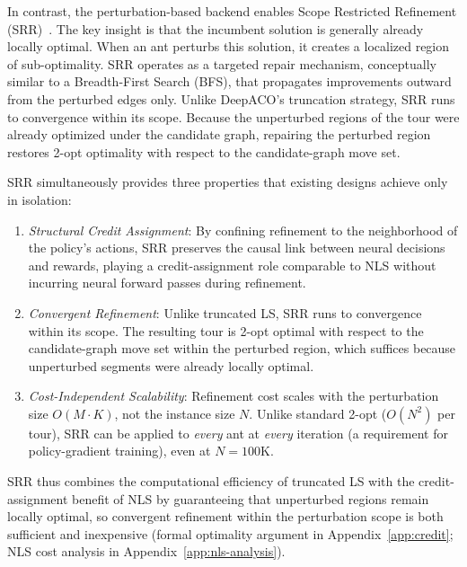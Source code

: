 \documentclass[sigconf]{acmart}
\begin{document}
In contrast, the perturbation-based backend enables Scope Restricted Refinement (SRR)~\cite{faco}.
The key insight is that the incumbent solution is generally already locally optimal.
When an ant perturbs this solution, it creates a localized region of sub-optimality.
SRR operates as a targeted repair mechanism, conceptually similar to a Breadth-First Search (BFS), that propagates improvements outward from the perturbed edges only.
Unlike DeepACO's truncation strategy, SRR runs to convergence within its scope.
Because the unperturbed regions of the tour were already optimized under the candidate graph, repairing the perturbed region restores 2-opt optimality with respect to the candidate-graph move set.

SRR simultaneously provides three properties that existing designs achieve only in isolation:
\begin{enumerate}
    \item \emph{Structural Credit Assignment}: By confining refinement to the neighborhood of the policy's actions, SRR preserves the causal link between neural decisions and rewards, playing a credit-assignment role comparable to NLS without incurring neural forward passes during refinement.
    \item \emph{Convergent Refinement}: Unlike truncated LS, SRR runs to convergence within its scope.  The resulting tour is 2-opt optimal with respect to the candidate-graph move set within the perturbed region, which suffices because unperturbed segments were already locally optimal.
    \item \emph{Cost-Independent Scalability}: Refinement cost scales with the perturbation size $O(M{\cdot}K)$, not the instance size $N$.  Unlike standard 2-opt ($O(N^2)$ per tour), SRR can be applied to \emph{every} ant at \emph{every} iteration (a requirement for policy-gradient training), even at $N{=}100$K.
\end{enumerate}
\noindent SRR thus combines the computational efficiency of truncated LS with the credit-assignment benefit of NLS by guaranteeing that unperturbed regions remain locally optimal, so convergent refinement within the perturbation scope is both sufficient and inexpensive (formal optimality argument in Appendix~\ref{app:credit}; NLS cost analysis in Appendix~\ref{app:nls-analysis}).
\end{document}
